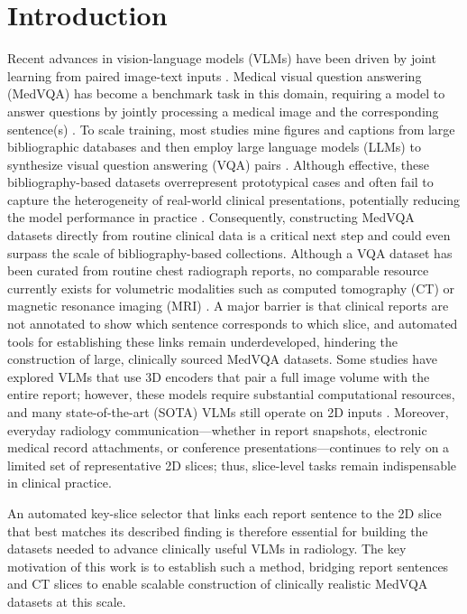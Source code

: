 \documentclass[bioengineering,article,submit,pdftex,moreauthors]{Definitions/mdpi}
\begin{document}
\section{Introduction}

Recent advances in vision-language models (VLMs) have been driven by joint learning from paired image-text inputs \cite{li_llava-next-interleave_2024,xiao_florence-2_2024,chen_internvl_2024,alayrac_flamingo_2022}. 
Medical visual question answering (MedVQA) has become a benchmark task in this domain, requiring a model to answer questions by jointly processing a medical image and the corresponding sentence(s) \cite{lau_dataset_2018,liu_slake_2021}. 
To scale training, most studies mine figures and captions from large bibliographic databases and then employ large language models (LLMs) to synthesize visual question answering (VQA) pairs \cite{zhang_pmc-vqa_2024,li_llava-med_2023}. 
Although effective, these bibliography-based datasets overrepresent prototypical cases and often fail to capture the heterogeneity of real-world clinical presentations, potentially reducing the model performance in practice \cite{zhang_pmc-vqa_2024,dong_generative_2025}. 
Consequently, constructing MedVQA datasets directly from routine clinical data is a critical next step and could even surpass the scale of bibliography-based collections. 
Although a VQA dataset has been curated from routine chest radiograph reports, no comparable resource currently exists for volumetric modalities such as computed tomography (CT) or magnetic resonance imaging (MRI) \cite{bae_ehrxqa_2024}. 
A major barrier is that clinical reports are not annotated to show which sentence corresponds to which slice, and automated tools for establishing these links remain underdeveloped, hindering the construction of large, clinically sourced MedVQA datasets. 
Some studies have explored VLMs that use 3D encoders that pair a full image volume with the entire report; however, these models require substantial computational resources, and many state-of-the-art (SOTA) VLMs still operate on 2D inputs \cite{bai_m3d_2024,blankemeier_merlin_2024,hamamci_ct2rep_2024}. 
Moreover, everyday radiology communication—whether in report snapshots, electronic medical record attachments, or conference presentations—continues to rely on a limited set of representative 2D slices; thus, slice-level tasks remain indispensable in clinical practice. 
 
An automated key-slice selector that links each report sentence to the 2D slice that best matches its described finding is therefore essential for building the datasets needed to advance clinically useful VLMs in radiology.
The key motivation of this work is to establish such a method, bridging report sentences and CT slices to enable scalable construction of clinically realistic MedVQA datasets at this scale.
\end{document}

